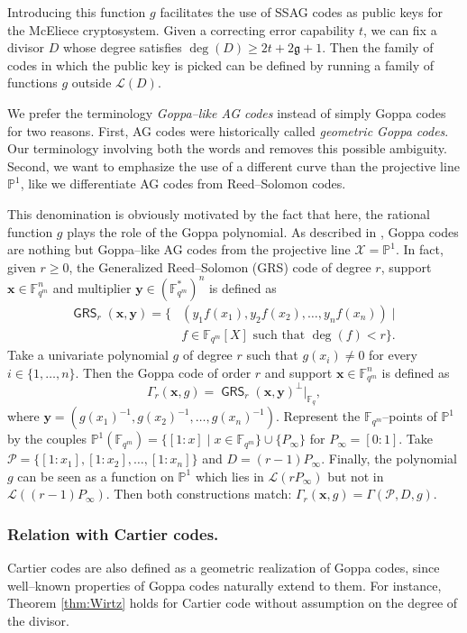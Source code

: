 \documentclass[lettersize,journal]{IEEEtran}
\theoremstyle{plain}
\theoremstyle{definition}
\theoremstyle{remark}
\newcommand{\calP}{\mathcal{P}}
\newcommand{\calL}{\mathcal{L}}
\newcommand{\calX}{\mathcal{X}}
\newcommand{\fqm}{\mathbb{F}_{q^m}}
\newcommand{\fq}{\mathbb{F}_{q}}
\newcommand{\PP}{\mathbb{P}}
\newcommand{\GRS}{\operatorname{\mathsf{GRS}}}
\begin{document}
	
	Introducing this function $g$ facilitates the use of SSAG codes as public keys for the McEliece cryptosystem. Given a correcting error capability $t$, we can fix a divisor $D$ whose degree satisfies $\deg (D) \geq 2t + 2\mathfrak{g}+1$. Then the family of codes in which the public key is picked can be defined by running a family of functions $g$ outside $\calL(D)$.
	
	
	\medskip
	
	We prefer the terminology \emph{Goppa--like AG codes} instead of simply Goppa codes for two reasons. First, AG codes were historically called \textit{geometric Goppa codes}. Our terminology involving both the words  and  removes this possible ambiguity. Second, we want to emphasize the use of a different curve than the projective line $\PP^1$, like we differentiate AG codes from Reed--Solomon codes.
	
	This denomination is obviously motivated by the fact that here, the rational function $g$ plays the role of the Goppa polynomial. As described in \cite[Example~9.1.8]{Sti09}, Goppa codes are nothing but Goppa--like AG codes from the projective line $\calX=\PP^1$. In fact, given $r \geq 0$, the Generalized Reed--Solomon (GRS) code of degree $r$, support $\mathbf{x} \in \fqm^n$ and multiplier $\mathbf{y} \in (\fqm^*)^n$ is defined as
	\[\begin{aligned}
	\GRS_r(\mathbf{x},\mathbf{y})=\{&(y_1f(x_1),y_2f(x_2),\dots,y_nf(x_n)) \mid\\& f \in \fqm[X] \text{ such that } \deg (f) < r \}.
	\end{aligned}\]
	Take a univariate polynomial $g$ of degree $r$ such that $g(x_i) \neq 0$ for every  $i \in \{1,\dots,n\}$. Then the Goppa code of order $r$ and support $\mathbf{x} \in \fqm^n$ is defined as
	\begin{equation}\label{eq:classical_Goppa}
		\Gamma_r(\mathbf{x},g)= \GRS_r(\mathbf{x},\mathbf{y})^\perp|_{\fq},
	\end{equation}
	where $\mathbf{y}=(g(x_1)^{-1},g(x_2)^{-1},\dots,g(x_n)^{-1})$.
	Represent the $\fqm$--points of $\PP^1$ by the couples $\PP^1(\fqm)=\{[1:x] \mid x \in \fqm\} \cup \{P_\infty\}$ for $P_\infty=[0:1]$. Take $\calP=\{[1:x_1],[1:x_2],\dots,[1:x_n]\}$ and $D=(r-1)P_\infty$. Finally, the polynomial $g$ can be seen as a function on $\PP^1$ which lies in $\calL(rP_\infty)$ but not in $\calL((r-1)P_\infty)$. Then both constructions match: $\Gamma_r(\mathbf{x},g)=\Gamma(\calP,D,g)$.
	
	\subsubsection{Relation with Cartier codes.} Cartier codes \cite{Cou14} are also defined as a geometric realization of Goppa codes, since well--known properties of Goppa codes naturally extend to them. For instance, Theorem \ref{thm:Wirtz} holds for Cartier code without assumption on the degree of the divisor.
	
\end{document}
